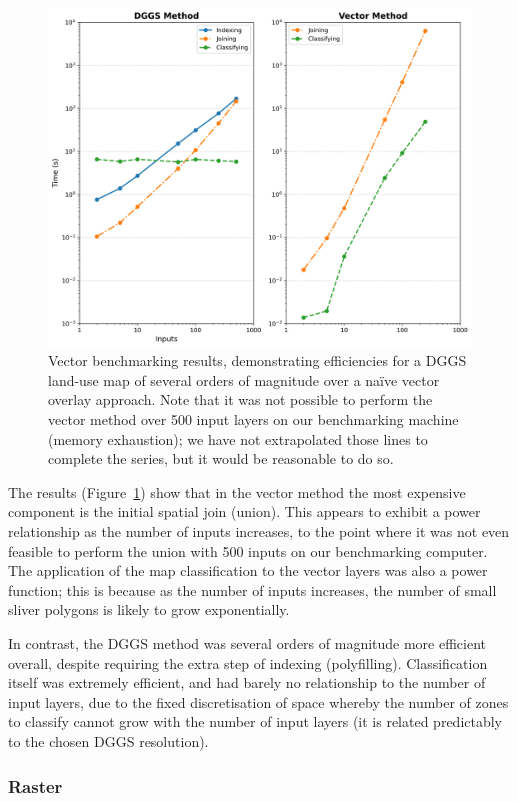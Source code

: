 \documentclass[]{interact}
\theoremstyle{plain}%
\theoremstyle{definition}
\theoremstyle{remark}
\begin{document}
\begin{figure}[t]
    \centering
    \includegraphics[width=0.65\linewidth]{images/vector-results.png}
    \caption{Vector benchmarking results, demonstrating efficiencies for a \ac{DGGS} land-use map of several orders of magnitude over a na\"{i}ve vector overlay approach. Note that it was not possible to perform the vector method over 500 input layers on our benchmarking machine (memory exhaustion); we have not extrapolated those lines to complete the series, but it would be reasonable to do so.}
    \label{fig:BenchmarkVect}
\end{figure}

The results (Figure~\ref{fig:BenchmarkVect}) show that in the vector method the most expensive component is the initial spatial join (union). This appears to exhibit a power relationship as the number of inputs increases, to the point where it was not even feasible to perform the union with 500 inputs on our benchmarking computer. The application of the map classification to the vector layers was also a power function; this is because as the number of inputs increases, the number of small sliver polygons is likely to grow exponentially.

In contrast, the \ac{DGGS} method was several orders of magnitude more efficient overall, despite requiring the extra step of indexing (polyfilling). Classification itself was extremely efficient, and had barely no relationship to the number of input layers, due to the fixed discretisation of space whereby the number of zones to classify cannot grow with the number of input layers (it is related predictably to the chosen \ac{DGGS} resolution).

\subsubsection{Raster}
\end{document}
